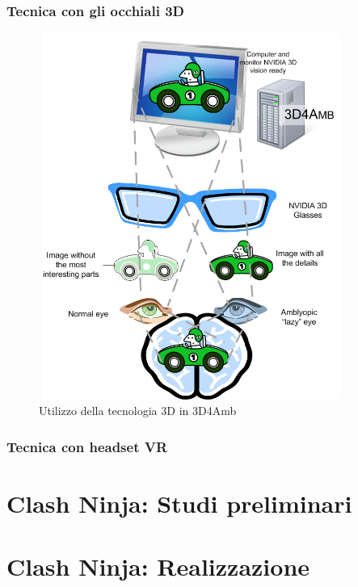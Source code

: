 \documentclass[12pt,a4paper,openright,twoside]{book}
\begin{document}
    \subsection{Tecnica con gli occhiali 3D}
     \begin{figure}[h]
    	\centering   	
    	\includegraphics[width=10cm, height=12cm]{visione.png}
    	\caption{Utilizzo della tecnologia 3D in 3D4Amb}
    	\label{fig:visione}
    \end{figure}
	\subsection{Tecnica con headset VR}
	\chapter{Clash Ninja: Studi preliminari} 
	\chapter{Clash Ninja: Realizzazione}   
    
    
\end{document}
